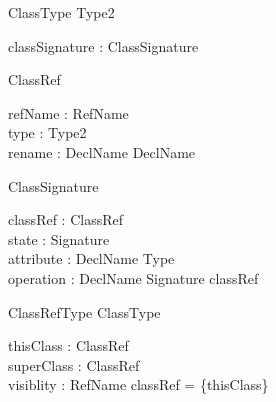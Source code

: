 \begin{sidebyside}
\begin{class}{ClassType}
  Type2\\
\begin{state}
  classSignature : ClassSignature
\end{state}
\end{class}
\nextside
\begin{class}{ClassRef}
\begin{state}
  refName : RefName\\
  type : \seq Type2 \\
  rename : DeclName \pfun DeclName
\end{state}
\end{class}
\end{sidebyside}
\begin{sidebyside}
\begin{class}{ClassSignature}
\begin{state}
  classRef : \finset ClassRef\\
  state : Signature\\
  attribute : DeclName \pfun Type\\
  operation : DeclName \pfun Signature
\where
  classRef \neq \emptyset
\end{state}
\end{class}
\nextside
\begin{class}{ClassRefType}
  ClassType\\
\begin{state}
  thisClass : ClassRef\\
  superClass : \finset ClassRef\\
  visiblity : \finset RefName
\where
  classRef = \{thisClass\}
\end{state}  
\end{class}
\end{sidebyside}

